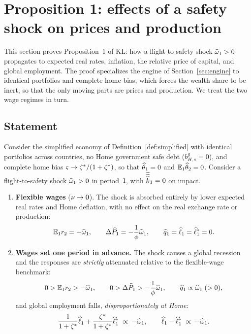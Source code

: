 \section{Proposition 1: effects of a safety shock on prices and production}
\label{sec:prop1}

This section proves Proposition~1 of KL: how a flight-to-safety shock
$\widehat{\omega}_1>0$ propagates to expected real rates, inflation, the relative price
of capital, and global employment. The proof specializes the
engine of Section~\ref{sec:engine} to identical portfolios and complete home
bias, which forces the wealth share to be inert, so that the only moving parts
are prices and production. We treat the two wage regimes in turn.

\subsection{Statement}

\begin{proposition}
\label{prop:prices}
Consider the simplified economy of Definition~\ref{def:simplified} with identical
portfolios across countries, no Home government safe debt
($b^g_{H,s}=0$), and complete home bias $\varsigma\to\zeta^{*}/(1+\zeta^{*})$, so that
$\widehat{\theta}_1=0$ and $\mathbb{E}_1\widehat{\theta}_2=0$. Consider a flight-to-safety shock
$\widehat{\omega}_1>0$ in period~$1$, with $\widetilde{\widetilde{\widehat{k}}}_1=0$ on
impact.
\begin{enumerate}[label=(\alph*),leftmargin=1.8em,itemsep=3pt]
  \item \textbf{Flexible wages} ($\nu\to0$). The shock is absorbed entirely
  by lower expected real rates and Home deflation, with no effect on the real
  exchange rate or production:
  \begin{equation}
  \mathbb{E}_1r_2 = -\widehat{\omega}_1, \qquad
  \Delta\widehat{P}_1 = -\frac{1}{\phi}\widehat{\omega}_1, \qquad
  \widehat{q}_1 = \widehat{\ell}_1 = \widehat{\ell}^{*}_1 = 0. \label{eq:prop1-flex}
  \end{equation}
  \item \textbf{Wages set one period in advance.} The shock causes a global
  recession and the responses are \emph{strictly} attenuated relative to the
  flexible-wage benchmark:
  \begin{equation}
  0 > \mathbb{E}_1r_2 > -\widehat{\omega}_1, \qquad
  0 > \Delta\widehat{P}_1 > -\frac{1}{\phi}\widehat{\omega}_1, \qquad
  \widehat{q}_1 \propto \widehat{\omega}_1 \;(>0), \label{eq:prop1-sticky}
  \end{equation}
  and global employment falls, \emph{disproportionately at Home}:
  \begin{equation}
  \frac{1}{1+\zeta^{*}}\widehat{\ell}_1 + \frac{\zeta^{*}}{1+\zeta^{*}}\widehat{\ell}^{*}_1 \;\propto\; -\widehat{\omega}_1, \qquad
  \widehat{\ell}_1 - \widehat{\ell}^{*}_1 \;\propto\; -\widehat{\omega}_1. \label{eq:prop1-labor}
  \end{equation}
\end{enumerate}
\end{proposition}

